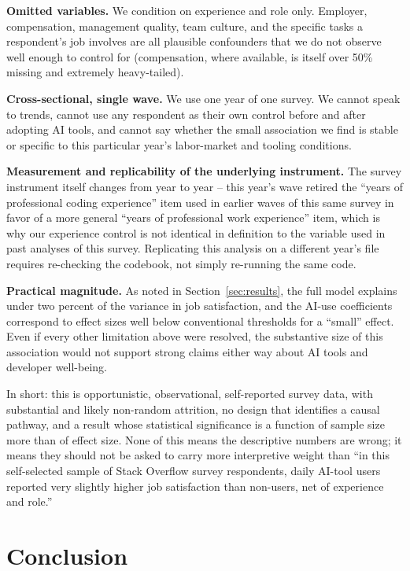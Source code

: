\documentclass[11pt]{article}
\begin{document}
\textbf{Omitted variables.} We condition on experience and role only.
Employer, compensation, management quality, team culture, and the
specific tasks a respondent's job involves are all plausible confounders
that we do not observe well enough to control for (compensation, where
available, is itself over 50\% missing and extremely heavy-tailed).

\textbf{Cross-sectional, single wave.} We use one year of one survey. We
cannot speak to trends, cannot use any respondent as their own control
before and after adopting AI tools, and cannot say whether the small
association we find is stable or specific to this particular year's
labor-market and tooling conditions.

\textbf{Measurement and replicability of the underlying instrument.} The
survey instrument itself changes from year to year -- this year's wave
retired the ``years of professional coding experience'' item used in
earlier waves of this same survey in favor of a more general ``years of
professional work experience'' item, which is why our experience control
is not identical in definition to the variable used in past analyses of
this survey. Replicating this analysis on a different year's file requires
re-checking the codebook, not simply re-running the same code.

\textbf{Practical magnitude.} As noted in Section~\ref{sec:results}, the
full model explains under two percent of the variance in job satisfaction,
and the AI-use coefficients correspond to effect sizes well below
conventional thresholds for a ``small'' effect. Even if every other
limitation above were resolved, the substantive size of this association
would not support strong claims either way about AI tools and developer
well-being.

In short: this is opportunistic, observational, self-reported survey data,
with substantial and likely non-random attrition, no design that
identifies a causal pathway, and a result whose statistical significance
is a function of sample size more than of effect size. None of this means
the descriptive numbers are wrong; it means they should not be asked to
carry more interpretive weight than ``in this self-selected sample of
Stack Overflow survey respondents, daily AI-tool users reported very
slightly higher job satisfaction than non-users, net of experience and
role.''

\section{Conclusion}
\end{document}

